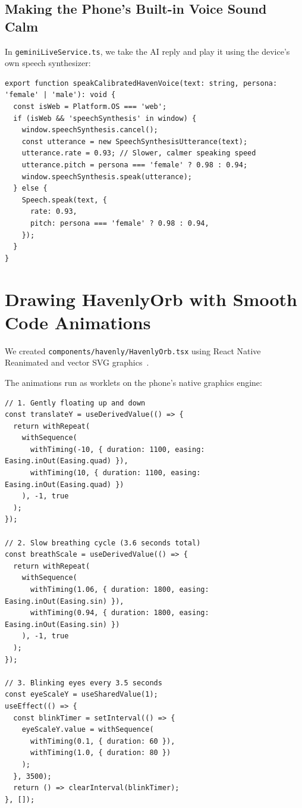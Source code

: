 \subsection{Making the Phone's Built-in Voice Sound Calm}
In \texttt{geminiLiveService.ts}, we take the AI reply and play it using the device's own speech synthesizer:
\begin{verbatim}
export function speakCalibratedHavenVoice(text: string, persona: 'female' | 'male'): void {
  const isWeb = Platform.OS === 'web';
  if (isWeb && 'speechSynthesis' in window) {
    window.speechSynthesis.cancel();
    const utterance = new SpeechSynthesisUtterance(text);
    utterance.rate = 0.93; // Slower, calmer speaking speed
    utterance.pitch = persona === 'female' ? 0.98 : 0.94;
    window.speechSynthesis.speak(utterance);
  } else {
    Speech.speak(text, {
      rate: 0.93,
      pitch: persona === 'female' ? 0.98 : 0.94,
    });
  }
}
\end{verbatim}

\section{Drawing HavenlyOrb with Smooth Code Animations}
\label{sec:impl_havenly_orb}

We created \texttt{components/havenly/HavenlyOrb.tsx} using React Native Reanimated and vector SVG graphics~\cite{balban2023respiration}. 

The animations run as worklets on the phone's native graphics engine:
\begin{verbatim}
// 1. Gently floating up and down
const translateY = useDerivedValue(() => {
  return withRepeat(
    withSequence(
      withTiming(-10, { duration: 1100, easing: Easing.inOut(Easing.quad) }),
      withTiming(10, { duration: 1100, easing: Easing.inOut(Easing.quad) })
    ), -1, true
  );
});

// 2. Slow breathing cycle (3.6 seconds total)
const breathScale = useDerivedValue(() => {
  return withRepeat(
    withSequence(
      withTiming(1.06, { duration: 1800, easing: Easing.inOut(Easing.sin) }),
      withTiming(0.94, { duration: 1800, easing: Easing.inOut(Easing.sin) })
    ), -1, true
  );
});

// 3. Blinking eyes every 3.5 seconds
const eyeScaleY = useSharedValue(1);
useEffect(() => {
  const blinkTimer = setInterval(() => {
    eyeScaleY.value = withSequence(
      withTiming(0.1, { duration: 60 }),
      withTiming(1.0, { duration: 80 })
    );
  }, 3500);
  return () => clearInterval(blinkTimer);
}, []);
\end{verbatim}

